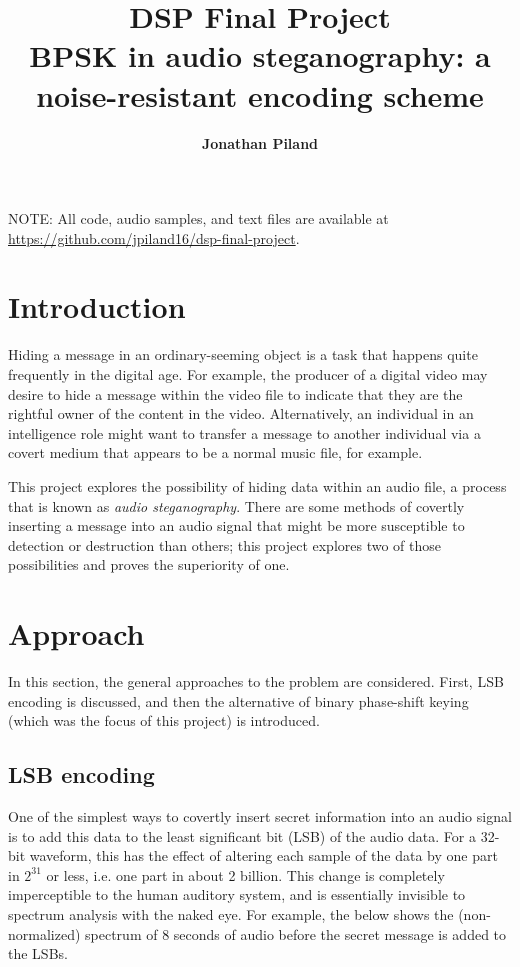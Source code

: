 \documentclass{article}
\title{\vspace{64pt} \bf{DSP Final Project} \\ \textnormal{BPSK in audio steganography: a noise-resistant encoding scheme}}
\author{\bf{Jonathan Piland}}
\date{\parbox{\linewidth}{\centering
  \endgraf\bigskip
  \classname\endgraf
  \classprof\endgraf\medskip
  Whiting School of Engineering \endgraf
Johns Hopkins University\endgraf\bigskip\displaydate{date}}}
\begin{document}
\maketitle

NOTE: All code, audio samples, and text files are available at 
\url{https://github.com/jpiland16/dsp-final-project}.

\newpage
\section{Introduction}
Hiding a message in an ordinary-seeming object is a task that happens quite
frequently in the digital age. For example, the producer of a digital video
may desire to hide a message within the video file to indicate that they are the rightful
owner of the content in the video. Alternatively, an individual in an intelligence
role might want to transfer a message to another individual via a covert medium
that appears to be a normal music file, for example.

\vspace{6pt}

This project explores the possibility of hiding data within an audio file, a process
that is known as \textit{audio steganography}. There are some methods of covertly inserting 
a message into an audio signal that might be
more susceptible to detection or destruction than others; this project explores
two of those possibilities and proves the superiority of one.

\section{Approach}

In this section, the general approaches to the problem are considered. First,
LSB encoding is discussed, and then the alternative of binary phase-shift keying
(which was the focus of this project) is introduced.

\subsection{LSB encoding}

One of the simplest ways to covertly insert secret information into an audio
signal is to add this data to the least significant bit (LSB) of the audio data.
For a 32-bit waveform, this has the effect of altering each sample of the data
by one part in $2^31$ or less, i.e. one part in about 2 billion. This change is
completely imperceptible to the human auditory system, and is essentially
invisible to spectrum analysis with the naked eye. For example, the below shows
the (non-normalized) spectrum of 8 seconds of audio before the secret message is
added to the LSBs. 
\end{document}

